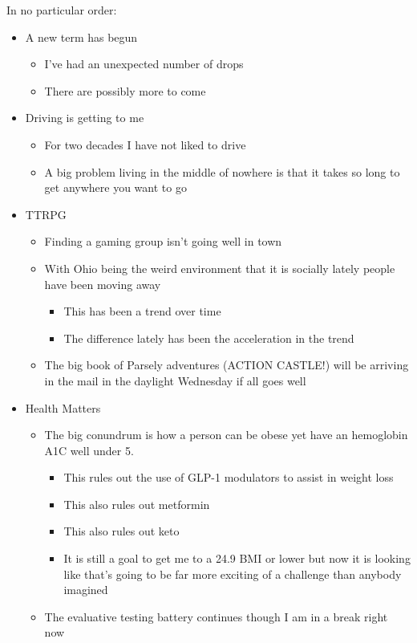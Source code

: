 In no particular order:

\begin{itemize}
\tightlist
\item
  A new term has begun

  \begin{itemize}
  \tightlist
  \item
    I've had an unexpected number of drops
  \item
    There are possibly more to come
  \end{itemize}
\item
  Driving is getting to me

  \begin{itemize}
  \tightlist
  \item
    For two decades I have not liked to drive
  \item
    A big problem living in the middle of nowhere is that it takes so
    long to get anywhere you want to go
  \end{itemize}
\item
  TTRPG

  \begin{itemize}
  \tightlist
  \item
    Finding a gaming group isn't going well in town
  \item
    With Ohio being the weird environment that it is socially lately
    people have been moving away

    \begin{itemize}
    \tightlist
    \item
      This has been a trend over time
    \item
      The difference lately has been the acceleration in the trend
    \end{itemize}
  \item
    The big book of Parsely adventures (ACTION CASTLE!) will be arriving
    in the mail in the daylight Wednesday if all goes well
  \end{itemize}
\item
  Health Matters

  \begin{itemize}
  \tightlist
  \item
    The big conundrum is how a person can be obese yet have an
    hemoglobin A1C well under 5.

    \begin{itemize}
    \tightlist
    \item
      This rules out the use of GLP-1 modulators to assist in weight
      loss
    \item
      This also rules out metformin
    \item
      This also rules out keto
    \item
      It is still a goal to get me to a 24.9 BMI or lower but now it is
      looking like that's going to be far more exciting of a challenge
      than anybody imagined
    \end{itemize}
  \item
    The evaluative testing battery continues though I am in a break
    right now


\end{itemize}
\end{itemize}
